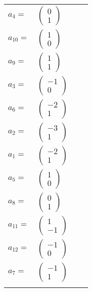 \documentclass[1p]{elsarticle_modified}
\theoremstyle{definition}
\begin{document}
\begin{tabular}{m{7pt} m{180pt} m{7pt} m{180pt} }
\flushright $a_{4}=$&$\begin{pmatrix}0\\1\end{pmatrix}$ \\
\flushright $a_{10}=$&$\begin{pmatrix}1\\0\end{pmatrix}$ \\
\flushright $a_{9}=$&$\begin{pmatrix}1\\1\end{pmatrix}$ \\
\flushright $a_{3}=$&$\begin{pmatrix}-1\\0\end{pmatrix}$ \\
\flushright $a_{6}=$&$\begin{pmatrix}-2\\1\end{pmatrix}$ \\
\flushright $a_{2}=$&$\begin{pmatrix}-3\\1\end{pmatrix}$ \\
\flushright $a_{1}=$&$\begin{pmatrix}-2\\1\end{pmatrix}$ \\
\flushright $a_{5}=$&$\begin{pmatrix}1\\0\end{pmatrix}$ \\
\flushright $a_{8}=$&$\begin{pmatrix}0\\1\end{pmatrix}$ \\
\flushright $a_{11}=$&$\begin{pmatrix}1\\-1\end{pmatrix}$ \\
\flushright $a_{12}=$&$\begin{pmatrix}-1\\0\end{pmatrix}$ \\
\flushright $a_{7}=$&$\begin{pmatrix}-1\\1\end{pmatrix}$\\&\end{tabular}
\end{document}
